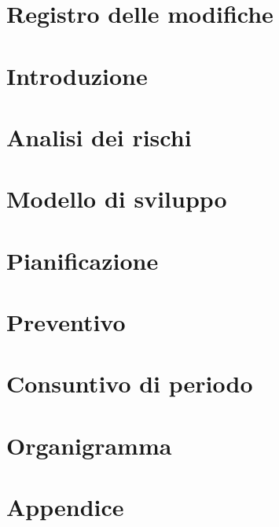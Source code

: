\documentclass[a4paper, oneside, openany, dvipsnames, table]{article}
\begin{document}
    \copertina{}
    
    \section*{Registro delle modifiche}\label{sec:Registro-modifiche}
    
    
    \newpage
    \tableofcontents
    
    \newpage
    \listoftables
    
    \newpage
    \listoffigures
    
    \newpage
    \section{Introduzione}\label{sec:Introduzione}
    

    \section{Analisi dei rischi}\label{sec:Analisi-rischi}
    

    \section{Modello di sviluppo}\label{sec:Modello-sviluppo}
    
    \newpage
    \section{Pianificazione}\label{sec:Pianificazione}
    

    \section{Preventivo}\label{sec:Preventivo}
    

    \newpage
    \section{Consuntivo di periodo}\label{sec:Consuntivo di periodo}
    
    \newpage
    \section{Organigramma}\label{sec:Organigramma}
    
    \newpage
    \setcounter{secnumdepth}{0}
    \section{Appendice}\label{sec:Appendice}
    \appendix
    
\end{document}
